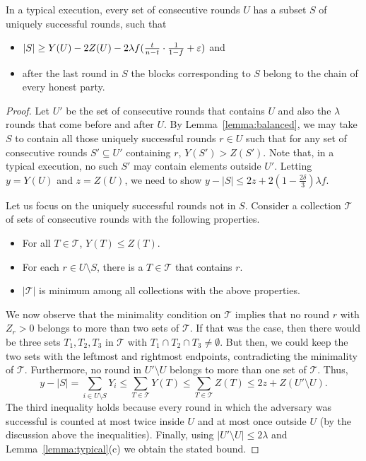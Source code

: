 \begin{lemma}[Unsuppressibility]\label{lem:unsuppressibility}
	In a typical execution,
	every set of consecutive rounds $U$ has a subset\/ $S$ of uniquely
	successful rounds, such that
	\begin{itemize}
		\item
			$|S|\geq Y(U)-2Z(U)-2\lambda f(\frac t{n-t}\cdot\frac1{1-f}+\varepsilon)$ and
		\item
			after the last round in $S$ the blocks corresponding to\/ $S$ belong to
			the chain of every honest party.
	\end{itemize}
\end{lemma}
\begin{proof}
	Let $U'$ be the set of consecutive rounds that contains $U$ and also the
	$\lambda$ rounds that come before and after $U$.
	By Lemma~\ref{lemma:balanced}, we may take $S$ to contain all those uniquely
	successful rounds $r\in U$ such that for any set of consecutive rounds
	$S'\subseteq U'$ containing $r$, $Y(S')>Z(S')$. Note that, in a typical execution,
	no such $S'$ may contain elements outside $U'$.
	Letting $y=Y(U)$ and $z=Z(U)$, we
	need to show $y-|S|\leq 2z+2(1-\frac{2\delta}{3})\lambda f$.

	Let us focus on the uniquely successful rounds not in $S$.
	Consider a collection $\mathcal{T}$ of sets of consecutive rounds with the
	following properties.
	\begin{itemize}
		\item
			For all $T\in\mathcal{T}$, $Y(T)\leq Z(T)$.
		\item
			For each $r\in U\setminus S$, there is a $T\in\mathcal{T}$ that contains $r$.
		\item
			$|\mathcal{T}|$ is minimum among all collections with the above properties.
	\end{itemize}
	We now observe that the minimality condition on $\mathcal{T}$ implies that no round
	$r$ with $Z_r>0$ belongs to more than two sets of $\mathcal{T}$. If that was the
	case, then there would be three sets $T_1,T_2,T_3$ in $\mathcal{T}$ with
	$T_1\cap T_2\cap T_3\neq\emptyset$. But then, we could keep the two sets
	with the leftmost and rightmost endpoints, contradicting the minimality of
	$\mathcal{T}$. Furthermore, no round in $U'\setminus U$ belongs to more than one set
	of $\mathcal{T}$. Thus,
	\[
		y-|S|=\sum_{i\in U\setminus S}Y_i
			\leq\sum_{T\in\mathcal{T}}Y(T)
			\leq\sum_{T\in\mathcal{T}}Z(T)
			\leq 2z+Z(U'\setminus U)
	.\]
	The third inequality holds because every round in which the adversary
	was successful is counted at most twice inside $U$ and at most once outside
	$U$ (by the discussion above the inequalities). Finally,
	using $|U'\setminus U|\leq 2\lambda$ and Lemma~\ref{lemma:typical}(c) we
	obtain the stated bound.
\end{proof}

